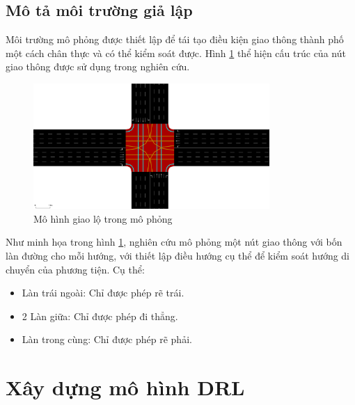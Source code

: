 \subsection{Mô tả môi trường giả lập}
Môi trường mô phỏng được thiết lập để tái tạo điều kiện giao thông thành phố một cách chân thực và có thể kiểm soát được. Hình \ref{fig:sumo_map} thể hiện cấu trúc của nút giao thông được sử dụng trong nghiên cứu.

\begin{figure}[!htp]
    \centering
    \includegraphics[width=0.8\textwidth]{figures/sumo_map}
    \caption{Mô hình giao lộ trong mô phỏng}
    \label{fig:sumo_map}
\end{figure}

Như minh họa trong hình \ref{fig:sumo_map}, nghiên cứu mô phỏng một nút giao thông với bốn làn đường cho mỗi hướng, với thiết lập điều hướng cụ thể để kiểm soát hướng di chuyển của phương tiện. Cụ thể:
\begin{itemize}
    \item Làn trái ngoài: Chỉ được phép rẽ trái.

    \item 2 Làn giữa: Chỉ được phép đi thẳng.

    \item Làn trong cùng: Chỉ được phép rẽ phải.
\end{itemize}

\section{Xây dựng mô hình DRL}
